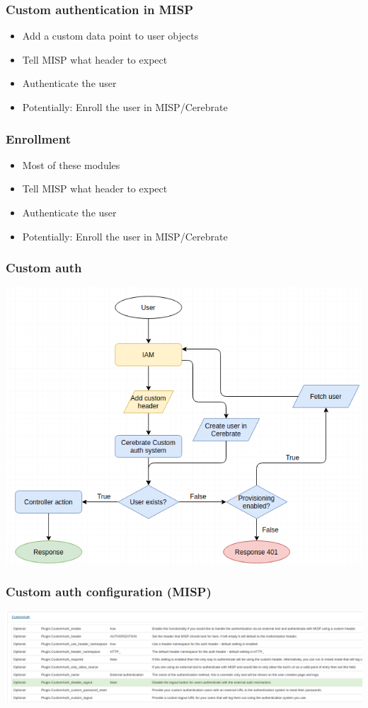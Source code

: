 \begin{frame}
  \frametitle{Custom authentication in MISP}
  \begin{itemize}
    \item Add a custom data point to user objects
    \item Tell MISP what header to expect
    \item Authenticate the user
    \item Potentially: Enroll the user in MISP/Cerebrate
  \end{itemize}
\end{frame}

\begin{frame}
  \frametitle{Enrollment}
  \begin{itemize}
    \item Most of these modules 
    \item Tell MISP what header to expect
    \item Authenticate the user
    \item Potentially: Enroll the user in MISP/Cerebrate
  \end{itemize}
\end{frame}

\begin{frame}
  \frametitle{Custom auth}
  \begin{center}
    \includegraphics[scale=0.5]{customAuth.png}
  \end{center}
\end{frame}

\begin{frame}
  \frametitle{Custom auth configuration (MISP)}
  \begin{center}
    \includegraphics[scale=0.4]{customAuthSettings.png}
  \end{center}
\end{frame}


